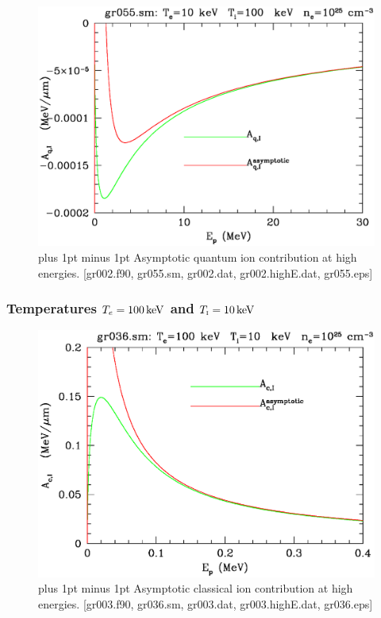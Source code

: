 \documentclass[preprint,12pt,eqsecnum,nofootinbib,amsmath,amssymb]{revtex4}
\newcommand{\smI}{{\rm\scriptscriptstyle I}}
\newcommand{\footnoteskip}{\baselineskip 12pt plus 1pt minus 1pt}
\begin{document}
\vskip-2cm 
\begin{figure}[h!]
\includegraphics[scale=0.45]{gr055.eps} 
\vskip-0.8cm 
\caption{\footnoteskip  
  Asymptotic quantum ion contribution at high energies. [gr002.f90,
  gr055.sm, gr002.dat, gr002.highE.dat, gr055.eps] 
}
\label{fig:gr055}
\end{figure}

\pagebreak
\subsubsection{Temperatures $T_e=100\,{\rm keV}$ and $T_\smI=10\,{\rm keV}$}

\vskip-2cm 
\begin{figure}[h!]
\includegraphics[scale=0.45]{gr036.eps} 
\vskip-0.8cm 
\caption{\footnoteskip  
  Asymptotic classical ion contribution at high energies. [gr003.f90,
  gr036.sm, gr003.dat, gr003.highE.dat, gr036.eps] 
}
\label{fig:gr036}
\end{figure}
\end{document}
